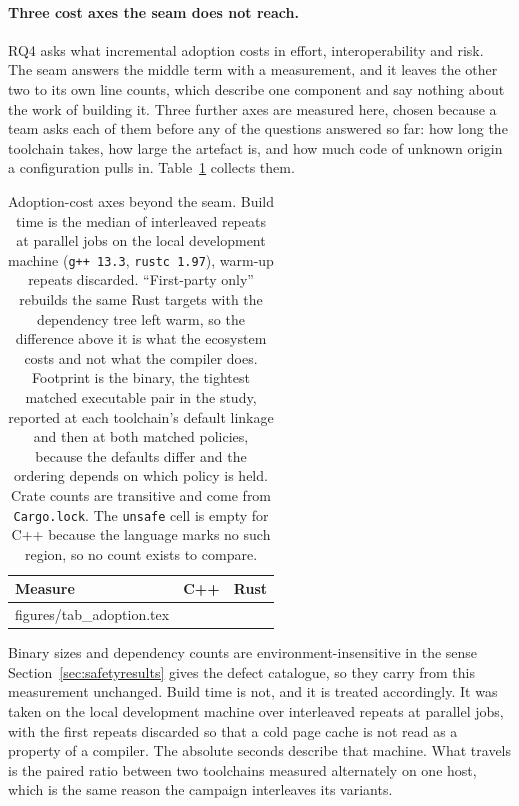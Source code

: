 \documentclass[english,oneside,a4paper,censored,csm,software-track-2020]{HYthesisML}
\makeatletter
\newcommand{\gentablebody}[1]{\@@input #1\relax}
\makeatother
\begin{document}
\paragraph{Three cost axes the seam does not reach.}
RQ4 asks what incremental adoption costs in effort, interoperability and risk. The seam answers
the middle term with a measurement, and it leaves the other two to its own line counts, which
describe one component and say nothing about the work of building it. Three further axes are
measured here, chosen because a team asks each of them before any of the questions answered so
far: how long the toolchain takes, how large the artefact is, and how much code of unknown origin
a configuration pulls in. Table~\ref{tab:adoption} collects them.

\begin{table}[tp]
\centering
\small
\caption[Adoption-cost axes: build time, static footprint, third-party surface]{Adoption-cost
axes beyond the seam. Build time is the median of \AdoptRepeats{} interleaved repeats at
\AdoptJobs{} parallel jobs on the local development machine (\texttt{g++~13.3},
\texttt{rustc~1.97}), warm-up repeats discarded. ``First-party only'' rebuilds the same Rust
targets with the dependency tree left warm, so the difference above it is what the ecosystem
costs and not what the compiler does. Footprint is the \texttt{\FootTarget} binary, the tightest
matched executable pair in the study, reported at each toolchain's default linkage and then at
both matched policies, because the defaults differ and the ordering depends on which policy is
held. Crate counts are transitive and come from \texttt{Cargo.lock}. The \texttt{unsafe} cell is
empty for C++ because the language marks no such region, so no count exists to
compare.\label{tab:adoption}}
\begin{tabular}{@{}l r r@{}}
\hline\hline
Measure & C++ & Rust \\
\hline
\gentablebody{figures/tab_adoption.tex}\\
\hline
\end{tabular}
\end{table}

Binary sizes and dependency counts are environment-insensitive in the sense
Section~\ref{sec:safetyresults} gives the defect catalogue, so they carry from this measurement
unchanged. Build time is not, and it is treated accordingly. It was taken on the local development
machine over \AdoptRepeats{} interleaved repeats at \AdoptJobs{} parallel jobs, with the first
repeats discarded so that a cold page cache is not read as a property of a compiler. The absolute
seconds describe that machine. What travels is the paired ratio between two toolchains measured
alternately on one host, which is the same reason the campaign interleaves its variants.
\end{document}
